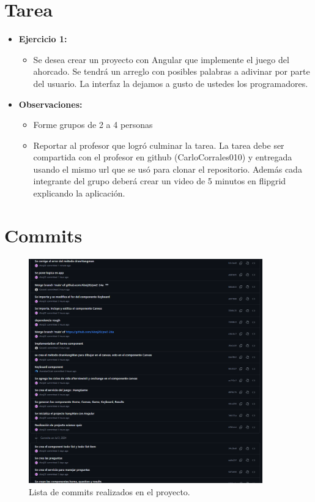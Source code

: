 \documentclass{article}
\begin{document}
\tableofcontents
\pagebreak


\section{Tarea}
\begin{itemize}
	\item \textbf{Ejercicio 1:}
	      \begin{itemize}
		      \item Se desea crear un proyecto con Angular que implemente el juego del ahorcado.  Se tendrá un arreglo con posibles palabras a adivinar por parte del usuario.  La interfaz la dejamos a gusto de ustedes los programadores.
	      \end{itemize}
	\item \textbf{Observaciones:}
	      \begin{itemize}
		      \item Forme grupos de 2 a 4 personas
		      \item Reportar al profesor que logró culminar la tarea. La tarea debe ser compartida con el profesor en github (CarloCorrales010) y entregada usando el mismo url que se usó para clonar el repositorio. Además cada integrante del grupo deberá crear un video de 5 minutos en flipgrid explicando la aplicación.
	      \end{itemize}
\end{itemize}
\pagebreak
\section{Commits}
\begin{figure}[H]
	\centering
	\includegraphics[width=0.9\textwidth,keepaspectratio]{img/commits.png}
	\caption{Lista de commits realizados en el proyecto.}
\end{figure}
\pagebreak
\end{document}
